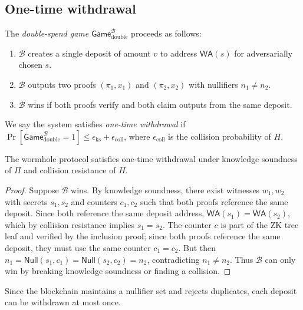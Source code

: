 \documentclass{iacrcc}
\newcommand{\WA}{\mathsf{WA}}
\newcommand{\Null}{\mathsf{Null}}
\begin{document}
\subsection{One-time withdrawal}

\begin{definition}
The \emph{double-spend game} \(\mathsf{Game}_{\mathrm{double}}^{\mathcal{B}}\) proceeds as follows:
\begin{enumerate}
    \item \(\mathcal{B}\) creates a single deposit of amount \(v\) to address \(\WA(s)\) for adversarially chosen \(s\).
    \item \(\mathcal{B}\) outputs two proofs \((\pi_1, x_1)\) and \((\pi_2, x_2)\) with nullifiers \(n_1 \neq n_2\).
    \item \(\mathcal{B}\) wins if both proofs verify and both claim outputs from the same deposit.
\end{enumerate}
We say the system satisfies \emph{one-time withdrawal} if \(\Pr[\mathsf{Game}_{\mathrm{double}}^{\mathcal{B}} = 1] \leq \epsilon_{\mathrm{ks}} + \epsilon_{\mathrm{coll}}\), where \(\epsilon_{\mathrm{coll}}\) is the collision probability of \(H\).
\end{definition}

\begin{theorem}
\label{thm:one-time}
The wormhole protocol satisfies one-time withdrawal under knowledge soundness of \(\Pi\) and collision resistance of \(H\).
\end{theorem}

\begin{proof}
Suppose \(\mathcal{B}\) wins. By knowledge soundness, there exist witnesses \(w_1, w_2\) with secrets \(s_1, s_2\) and counters \(c_1, c_2\) such that both proofs reference the same deposit. Since both reference the same deposit address, \(\WA(s_1) = \WA(s_2)\), which by collision resistance implies \(s_1 = s_2\). The counter \(c\) is part of the ZK tree leaf and verified by the inclusion proof; since both proofs reference the same deposit, they must use the same counter \(c_1 = c_2\). But then \(n_1 = \Null(s_1, c_1) = \Null(s_2, c_2) = n_2\), contradicting \(n_1 \neq n_2\). Thus \(\mathcal{B}\) can only win by breaking knowledge soundness or finding a collision.
\end{proof}

Since the blockchain maintains a nullifier set and rejects duplicates, each deposit can be withdrawn at most once.
\end{document}
